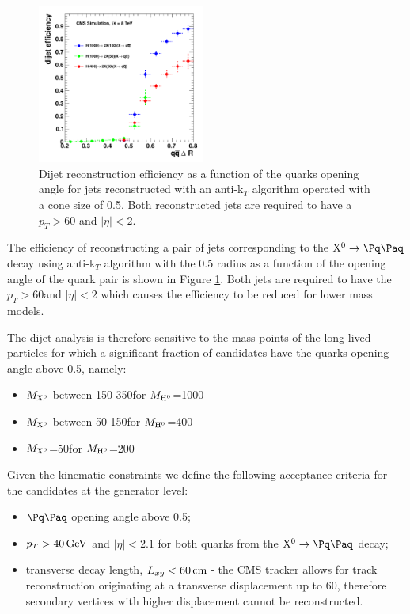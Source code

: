 \begin{figure}[htbp]
\centering
\includegraphics[width=0.49\textwidth]{plots/signal/effDijet.pdf}
\caption{Dijet reconstruction efficiency as a function of the quarks opening angle for jets reconstructed with an
anti-k$_T$ algorithm operated with a cone size of 0.5. Both reconstructed jets are required to have a $p_T>60$\GeV
and $|\eta|<2$.  \label{fig:effdR}}
\end{figure}

The efficiency of reconstructing a pair of jets
 corresponding to the $\X \to \qq$ decay using anti-k$_T$ algorithm with the 0.5 radius as a function of the
opening angle of the quark pair is shown in Figure \ref{fig:effdR}. Both jets are required 
to have the $p_T>60$\GeV and $|\eta|<2$ which causes the 
efficiency to be reduced for lower \Higgs  mass models.
 

The dijet analysis is therefore sensitive to the mass points of the long-lived particles \X for which 
a significant fraction of candidates have the quarks opening angle above 0.5, namely:
\begin{itemize}
\item $M_{\mathrm{X^{0}}}$ between 150-350\GeV for $M_{\mathrm{H}^{0}}$=1000\GeV
\item $M_{\mathrm{X^{0}}}$ between 50-150\GeV for $M_{\mathrm{H}^{0}}$=400\GeV
\item $M_{\mathrm{X^{0}}}$=50\GeV for $M_{\mathrm{H}^{0}}$=200\GeV
\end{itemize}

Given the kinematic constraints we define the following acceptance criteria 
for the \X candidates at the generator level:
\begin{itemize}
 \item $\qq$ opening angle above 0.5;
 \item $p_T>40\,\text{Ge\hspace{-.08em}V}$ and $|\eta|<2.1$ for both quarks from the $\X \to \qq$ decay;
 \item transverse decay length, $L_{xy}<60\,\text{cm}$ - the CMS tracker allows for track reconstruction originating at
a transverse displacement up to 60\cm, therefore secondary vertices with higher displacement cannot be reconstructed.
\end{itemize}

